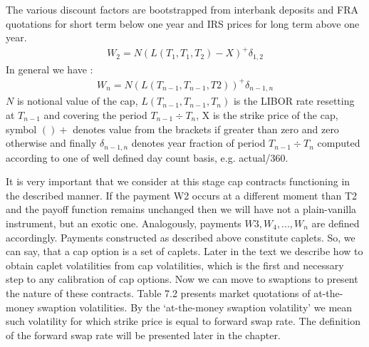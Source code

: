 \documentclass[11pt]{article}
\numberwithin{equation}{subsection}
\begin{document}
\newpage
The various discount factors are bootstrapped from interbank deposits and FRA quotations
for short term below one year and IRS prices for long term above one year.
\begin{eqnarray*}
	W_2 = N(L(T_1, T_1, T_2)-X)^{+} \delta_{1,2}
\end{eqnarray*}
In general we have :
\begin{eqnarray*}
	W_n = N(L(T_{n-1}, T_{n-1}, T2))^{+} \delta_{n-1, n}
\end{eqnarray*}
\(N\) is notional value of the cap, \(L(T_{n-1}, T_{n-1}, T_n)\) is the LIBOR rate resetting at \(T_{n−1}\)
and covering the period \(T_{n−1}÷T_{n} \), X is the strike price of the cap, symbol \(()+\) denotes value from the brackets if greater than zero and zero otherwise and finally \(\delta_{n-1, n}\) denotes year fraction of period \(T_{n−1}÷T_n\)
computed according to one of well defined day count basis, e.g. actual/360.

It is very important that we consider at this stage cap contracts functioning in the described
manner. If the payment W2 occurs at a different moment than T2 and the payoff function
remains unchanged then we will have not a plain-vanilla instrument, but an exotic one.
Analogously, payments \(W3, W_4,...,W_n\) are defined accordingly.
Payments constructed as described above constitute caplets. So, we can say, that a cap
option is a set of caplets. Later in the text we describe how to obtain caplet volatilities from
cap volatilities, which is the first and necessary step to any calibration of cap options.
Now we can move to swaptions to present the nature of these contracts. Table 7.2 presents
market quotations of at-the-money swaption volatilities. By the ‘at-the-money swaption
volatility’ we mean such volatility for which strike price is equal to forward swap rate. The
definition of the forward swap rate will be presented later in the chapter.
\end{document}
